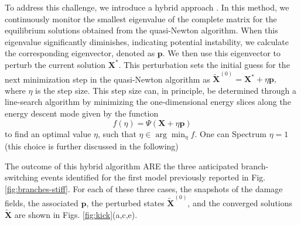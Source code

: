 To address this challenge, we introduce a hybrid approach . In this method, we continuously monitor the smallest eigenvalue of the complete  matrix for the equilibrium solutions obtained from the quasi-Newton algorithm.
When this eigenvalue significantly diminishes, indicating potential instability, we calculate the corresponding eigenvector, denoted as \(\mathbf{p}\). We then use this eigenvector to perturb the current solution $\mathbf{X^*}$. This perturbation sets the initial guess for the next minimization step in the quasi-Newton algorithm as $\mathbf{\tilde X}^{(0)} = \mathbf{X^*} + \eta \mathbf{p},
$ where \(\eta\) is the step size.
This step size can, in principle, be determined through a line-search algorithm by minimizing the one-dimensional energy slices along the energy descent mode given by the function 
$$f(\eta) = \Psi(\mathbf{X} + \eta \mathbf{p})
\label{eqn:energy-slice}$$
 to find an optimal value \(\eta\), such that $\eta \in \arg \min_{\eta} f$. One can Spectrum \(\eta = 1\)   (this choice is further discussed in the following) 

The outcome of this hybrid algorithm ARE the three anticipated branch-switching events identified for the first model previously reported in Fig. \ref{fig:branches-stiff}. For each of these three cases, the snapshots of the damage fields, the associated  \(\mathbf{p}\),  the perturbed states \(\mathbf{\tilde X}^{(0)}\), and the converged solutions $\mathbf{\tilde X}$ are shown in Figs. \ref{fig:kick}(a,c,e).

